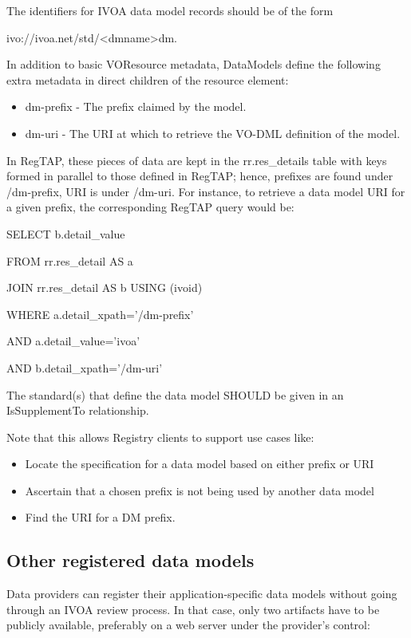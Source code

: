 \documentclass[10pt,a4paper]{ivoa}
\begin{document}
The identifiers for IVOA data model records should be of the form

ivo://ivoa.net/std/\textless dmname\textgreater dm.

In addition to basic VOResource metadata, DataModels define the
following extra metadata in direct children of the resource element:

\begin{itemize}
\item
  dm-prefix - The prefix claimed by the model.
\item
  dm-uri - The URI at which to retrieve the VO-DML definition of the
  model.
\end{itemize}

In RegTAP, these pieces of data are kept in the rr.res\_details table
with keys formed in parallel to those defined in RegTAP; hence, prefixes
are found under /dm-prefix, URI is under /dm-uri. For instance, to
retrieve a data model URI for a given prefix, the corresponding RegTAP
query would be:

SELECT b.detail\_value

FROM rr.res\_detail AS a

JOIN rr.res\_detail AS b USING (ivoid)

WHERE a.detail\_xpath='/dm-prefix'

AND a.detail\_value='ivoa'

AND b.detail\_xpath='/dm-uri'

The standard(s) that define the data model SHOULD be given in an
IsSupplementTo relationship.

Note that this allows Registry clients to support use cases like:

\begin{itemize}
\item
  Locate the specification for a data model based on either prefix or
  URI
\item
  Ascertain that a chosen prefix is not being used by another data model
\item
  Find the URI for a DM prefix.
\end{itemize}

\hypertarget{other-registered-data-models}{%
\subsection{Other registered data
models}\label{other-registered-data-models}}

Data providers can register their application-specific data models
without going through an IVOA review process. In that case, only two
artifacts have to be publicly available, preferably on a web server
under the provider's control:
\end{document}
